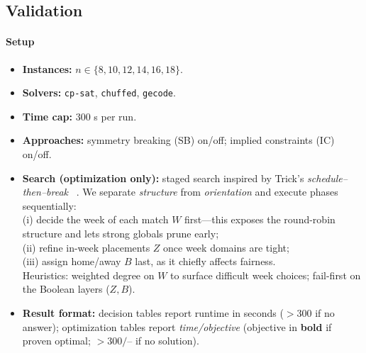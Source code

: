 \documentclass{article}
\begin{document}
\subsection{Validation}
\label{subsec:cp-validation}

\paragraph{Setup}
\begin{itemize}\setlength{\itemsep}{2pt}
  \item \textbf{Instances:} \(n\in\{8,10,12,14,16,18\}\).
  \item \textbf{Solvers:} \texttt{cp-sat}, \texttt{chuffed}, \texttt{gecode}.
  \item \textbf{Time cap:} \(300\) s per run.
  \item \textbf{Approaches:} symmetry breaking (SB) on/off; implied
        constraints (IC) on/off.
  \item \textbf{Search (optimization only):}
        staged search inspired by Trick’s \emph{schedule–then–break}%
        ~\cite{TrickScheduleThenBreak}.
        We separate \emph{structure} from \emph{orientation} and execute
        phases sequentially:\\
        (i) decide the week of each match \(W\) first---this exposes the
        round-robin structure and lets strong globals prune early;\\
        (ii) refine in-week placements \(Z\) once week domains are tight;\\
        (iii) assign home/away \(B\) last, as it chiefly affects fairness.\\
        Heuristics: weighted degree on \(W\) to surface difficult week
        choices; fail-first on the Boolean layers (\(Z,B\)).
  \item \textbf{Result format:}
        decision tables report runtime in seconds (\(>300\) if no answer);
        optimization tables report \emph{time/objective} (objective in
        \textbf{bold} if proven optimal; \(>300/\text{--}\) if no solution).
\end{itemize}
\end{document}
